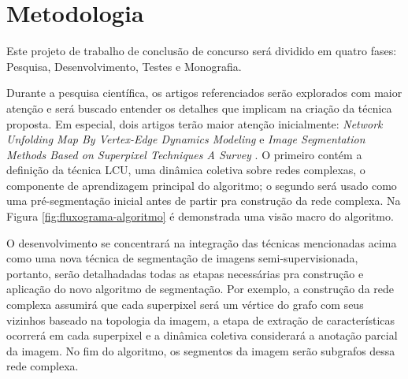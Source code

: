 \chapter{Metodologia}\label{cap:metodologia}


Este projeto de trabalho de conclusão de concurso será dividido em quatro fases:
Pesquisa, Desenvolvimento, Testes e Monografia.

Durante a pesquisa científica, os artigos referenciados serão explorados com
maior atenção e será buscado entender os detalhes que implicam
na criação da técnica proposta. Em especial, dois artigos terão maior
atenção inicialmente: \textit{Network Unfolding Map By Vertex-Edge
  Dynamics Modeling} \cite{VerriNetworkUnfoldingMap2018} e
\textit{Image Segmentation Methods Based on Superpixel Techniques A
  Survey} \cite{SuperpixelSurvey2020}. O primeiro contém a definição
da técnica LCU, uma dinâmica coletiva sobre redes complexas, o
componente de aprendizagem principal do algoritmo; o segundo será
usado como uma pré-segmentação inicial antes de partir pra construção
da rede complexa. Na Figura \ref{fig:fluxograma-algoritmo} é demonstrada uma
visão macro do algoritmo.

\begin{figure}[!h]
        \captionsetup{width=8cm}
		\centering
\end{figure}


O desenvolvimento se concentrará na integração das técnicas
mencionadas acima como uma nova técnica de segmentação de imagens
semi-supervisionada, portanto, serão detalhadadas todas as
etapas necessárias pra construção e aplicação do novo algoritmo de
segmentação. Por exemplo, a construção da rede complexa assumirá
que cada superpixel será um vértice do grafo com seus vizinhos baseado
na topologia da imagem, a etapa de extração de características
ocorrerá em cada superpixel e a dinâmica coletiva considerará a
anotação parcial da imagem. No fim do algoritmo, os segmentos da
imagem serão subgrafos dessa rede complexa.

